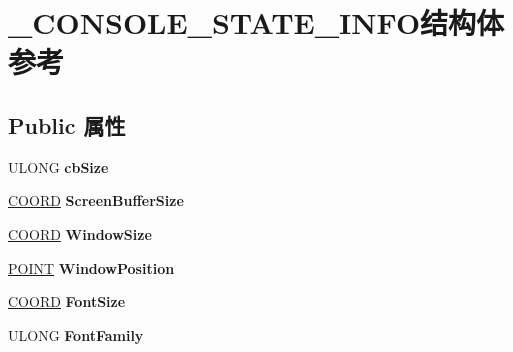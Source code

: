 \hypertarget{struct___c_o_n_s_o_l_e___s_t_a_t_e___i_n_f_o}{}\section{\+\_\+\+C\+O\+N\+S\+O\+L\+E\+\_\+\+S\+T\+A\+T\+E\+\_\+\+I\+N\+F\+O结构体 参考}
\label{struct___c_o_n_s_o_l_e___s_t_a_t_e___i_n_f_o}
\subsection*{Public 属性}
\begin{DoxyCompactItemize}
\item 
\mbox{\label{struct___c_o_n_s_o_l_e___s_t_a_t_e___i_n_f_o_aab17a5c3cfdfe3b4e1d9b00a4d84c3aa}} 
U\+L\+O\+NG {\bfseries cb\+Size}
\item 
\mbox{\label{struct___c_o_n_s_o_l_e___s_t_a_t_e___i_n_f_o_a27041c779684e24825822e6ff1fc7996}} 
\hyperlink{struct___c_o_o_r_d}{C\+O\+O\+RD} {\bfseries Screen\+Buffer\+Size}
\item 
\mbox{\label{struct___c_o_n_s_o_l_e___s_t_a_t_e___i_n_f_o_a2e180194898e2cd19a3d2128dbe832fa}} 
\hyperlink{struct___c_o_o_r_d}{C\+O\+O\+RD} {\bfseries Window\+Size}
\item 
\mbox{\label{struct___c_o_n_s_o_l_e___s_t_a_t_e___i_n_f_o_aaeac24029c6f6b7cba37d65a14d80a6e}} 
\hyperlink{structtag_p_o_i_n_t}{P\+O\+I\+NT} {\bfseries Window\+Position}
\item 
\mbox{\label{struct___c_o_n_s_o_l_e___s_t_a_t_e___i_n_f_o_ac07f70f0ace612618167da242dd3ac31}} 
\hyperlink{struct___c_o_o_r_d}{C\+O\+O\+RD} {\bfseries Font\+Size}
\item 
\mbox{\label{struct___c_o_n_s_o_l_e___s_t_a_t_e___i_n_f_o_a561b9d4fc1ef03525ae2c24698a9eed9}} 
U\+L\+O\+NG {\bfseries Font\+Family}
\item 
\mbox{\label{struct___c_o_n_s_o_l_e___s_t_a_t_e___i_n_f_o_ad2cc8992c3177272fc70b4a89695016f}} 

\end{DoxyCompactItemize}
